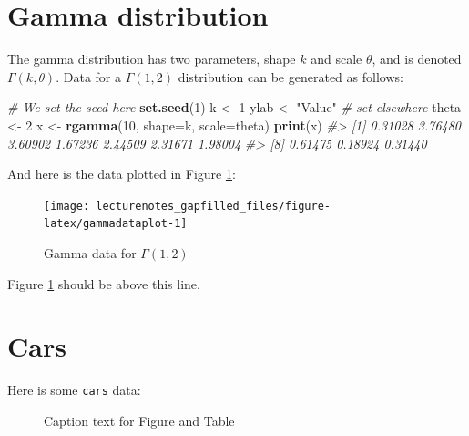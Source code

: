 \documentclass[
]{book}
\newenvironment{Shaded}{\begin{snugshade}}{\end{snugshade}}
\newcommand{\CommentTok}[1]{\textcolor[rgb]{0.56,0.35,0.01}{\textit{#1}}}
\newcommand{\DataTypeTok}[1]{\textcolor[rgb]{0.13,0.29,0.53}{#1}}
\newcommand{\DecValTok}[1]{\textcolor[rgb]{0.00,0.00,0.81}{#1}}
\newcommand{\KeywordTok}[1]{\textcolor[rgb]{0.13,0.29,0.53}{\textbf{#1}}}
\newcommand{\NormalTok}[1]{#1}
\newcommand{\StringTok}[1]{\textcolor[rgb]{0.31,0.60,0.02}{#1}}
\renewcommand{\CommentTok}[1]{\textcolor[rgb]{0.3,0.3,0.3}{\textit{#1}}}
\renewcommand{\DecValTok}[1]{\textcolor[RGB]{229,120,109}{#1}}
\renewcommand{\DecValTok}[1]{\textcolor[RGB]{203,75,22}{#1}}
\begin{document}
\hypertarget{gamma-distribution}{%
\section{Gamma distribution}\label{gamma-distribution}}

The gamma distribution has two parameters, shape \(k\) and scale \(\theta\), and is denoted \(\Gamma(k, \theta)\).
Data for a \(\Gamma(1, 2)\) distribution can be generated as follows:

\begin{Shaded}
\begin{Highlighting}[]
\CommentTok{# We set the seed here}
\KeywordTok{set.seed}\NormalTok{(}\DecValTok{1}\NormalTok{)}
\NormalTok{k <-}\StringTok{ }\DecValTok{1}
\NormalTok{ylab <-}\StringTok{  "Value"} \CommentTok{# set elsewhere}
\NormalTok{theta <-}\StringTok{ }\DecValTok{2}
\NormalTok{x <-}\StringTok{ }\KeywordTok{rgamma}\NormalTok{(}\DecValTok{10}\NormalTok{, }\DataTypeTok{shape=}\NormalTok{k, }\DataTypeTok{scale=}\NormalTok{theta)}
\KeywordTok{print}\NormalTok{(x)}
\CommentTok{#>  [1] 0.31028 3.76480 3.60902 1.67236 2.44509 2.31671 1.98004}
\CommentTok{#>  [8] 0.61475 0.18924 0.31440}
\end{Highlighting}
\end{Shaded}

And here is the data plotted in Figure \ref{fig:gammadataplot}:

\begin{figure}[H]

{\centering \texttt{[image: lecturenotes\_gapfilled\_files/figure-latex/gammadataplot-1]} 

}

\caption{Gamma data for $\Gamma(1, 2)$}\label{fig:gammadataplot}
\end{figure}

Figure \ref{fig:gammadataplot} should be above this line.

\clearpage

\hypertarget{cars}{%
\section{Cars}\label{cars}}

Here is some \texttt{cars} data:

\begin{figure}[H]

{\centering {}

}

\caption{Caption text for Figure and Table}\label{fig:carsfigureandtable}
\end{figure}
\end{document}
